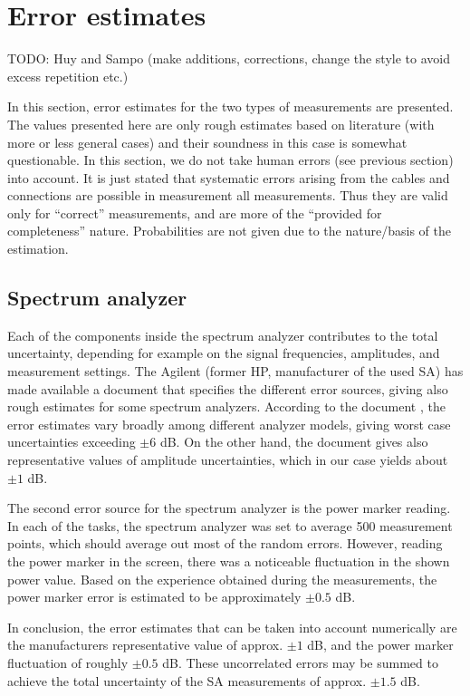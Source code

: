 \documentclass[a4paper, 12pt]{article}
\begin{document}
\newpage
\section{Error estimates}

TODO: Huy and Sampo (make additions, corrections, change the style to avoid excess 
repetition etc.)

In this section, error estimates for the two types of measurements are presented.
The values presented here are only rough estimates based on literature (with more 
or less general cases) and their soundness in this case is somewhat questionable. 
In this section, we do not take human errors (see previous section) into account. 
It is just stated that systematic errors arising from the cables and connections 
are possible in measurement all measurements. Thus they are valid only for 
``correct'' measurements, and are more of the ``provided for completeness'' 
nature. Probabilities are not given due to the nature/basis of the estimation.


\subsection{Spectrum analyzer}

Each of the components inside the spectrum analyzer contributes to the total uncertainty, 
depending for example on the signal frequencies, amplitudes, and measurement settings. 
The Agilent (former HP, manufacturer of the used SA) has made available a document that 
specifies the different error sources, giving also rough estimates for some spectrum 
analyzers. According to the document \cite{sa}, the error estimates vary broadly among 
different analyzer models, giving worst case uncertainties exceeding $\pm 6$ dB. On the 
other hand, the document gives also representative values of amplitude uncertainties, 
which in our case yields about $\pm 1$ dB.

The second error source for the spectrum analyzer is the power marker reading. In 
each of the tasks, the spectrum analyzer was set to average 500 measurement points, 
which should average out most of the random errors. However, reading the power marker 
in the screen, there was a noticeable fluctuation in the shown power value. Based on the 
experience obtained during the measurements, the power marker error is estimated to be 
approximately $\pm 0.5$ dB.

In conclusion, the error estimates that can be taken into account numerically are 
the manufacturers representative value of approx. $\pm 1$ dB, and the power marker 
fluctuation of roughly $\pm 0.5$ dB. These uncorrelated errors may be summed to 
achieve the total uncertainty of the SA measurements of approx. $\pm 1.5$ dB. 
\end{document}
